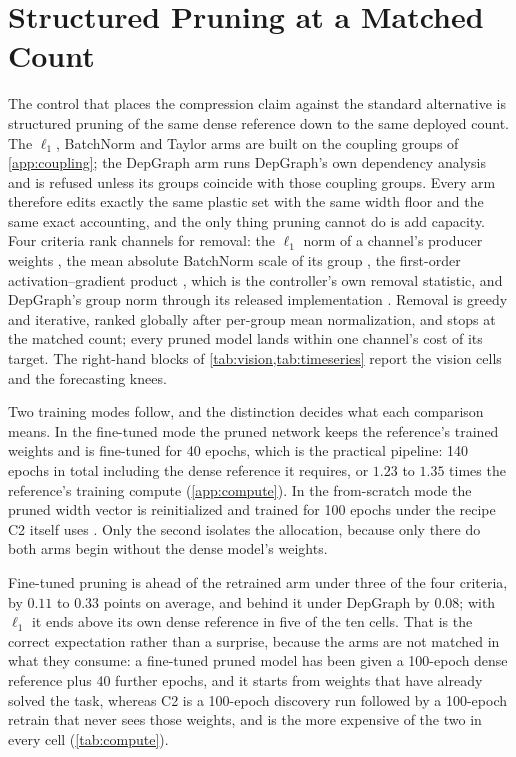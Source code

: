 \documentclass[10pt]{article}
\theoremstyle{paper}
\begin{document}
\section{Structured Pruning at a Matched Count}
\label{app:pruning}
The control that places the compression claim against the standard alternative is structured
pruning of the same dense reference down to the same deployed count. The $\ell_1$, BatchNorm and
Taylor arms are built on the coupling groups of \cref{app:coupling}; the DepGraph arm runs
DepGraph's own dependency analysis and is refused unless its groups coincide with those coupling
groups. Every arm therefore edits exactly the same plastic set with the same width floor and the
same exact accounting, and the only thing pruning cannot do is add capacity. Four criteria rank channels for removal:
the $\ell_1$ norm of a channel's producer weights \citep{li2016pruning}, the mean absolute
BatchNorm scale of its group \citep{liu2017learning}, the first-order activation--gradient
product \citep{molchanov2017pruning}, which is the controller's own removal statistic, and
DepGraph's group norm through its released implementation \citep{10204583}. Removal is
greedy and iterative, ranked globally after per-group mean normalization, and stops at the matched
count; every pruned model lands within one channel's cost of its target. The right-hand blocks of \cref{tab:vision,tab:timeseries}
report the vision cells and the forecasting knees.

Two training modes follow, and the distinction decides what each comparison means. In the
fine-tuned mode the pruned network keeps the reference's trained weights and is fine-tuned for 40
epochs, which is the practical pipeline: 140 epochs in total including the dense reference it
requires, or $1.23$ to $1.35$ times the reference's training compute (\cref{app:compute}). In the from-scratch mode the pruned width vector is reinitialized and
trained for 100 epochs under the recipe C2 itself uses \citep{liu2018rethinking}. Only the second
isolates the allocation, because only there do both arms begin without the dense model's weights.

Fine-tuned pruning is ahead of the retrained arm under three of the four criteria, by $0.11$ to
$0.33$ points on average, and behind it under DepGraph by $0.08$; with $\ell_1$ it ends above its own
dense reference in five of the ten cells. That is
the correct expectation rather than a surprise, because the arms are not matched in what they
consume: a fine-tuned pruned model has been given a 100-epoch dense reference plus 40 further
epochs, and it starts from weights that have already solved the task, whereas C2 is a 100-epoch
discovery run followed by a 100-epoch retrain that never sees those weights, and is the more
expensive of the two in every cell (\cref{tab:compute}).
\end{document}
